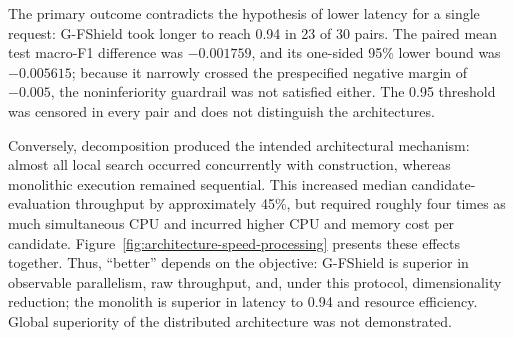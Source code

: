 \begin{landscape}
\begin{table}[p]
\centering
\scriptsize
\caption{Causal campaign: architecture medians and paired comparisons across 30 seeds.}
\label{tab:architecture-causal}
\end{table}
\end{landscape}

The primary outcome contradicts the hypothesis of lower latency for a single request: G-FShield took longer to reach 0.94 in 23 of 30 pairs. The paired mean test macro-F1 difference was $-0.001759$, and its one-sided 95\% lower bound was $-0.005615$; because it narrowly crossed the prespecified negative margin of $-0.005$, the noninferiority guardrail was not satisfied either. The 0.95 threshold was censored in every pair and does not distinguish the architectures.

Conversely, decomposition produced the intended architectural mechanism: almost all local search occurred concurrently with construction, whereas monolithic execution remained sequential. This increased median candidate-evaluation throughput by approximately 45\%, but required roughly four times as much simultaneous CPU and incurred higher CPU and memory cost per candidate. Figure~\ref{fig:architecture-speed-processing} presents these effects together. Thus, ``better'' depends on the objective: G-FShield is superior in observable parallelism, raw throughput, and, under this protocol, dimensionality reduction; the monolith is superior in latency to 0.94 and resource efficiency. Global superiority of the distributed architecture was not demonstrated.

